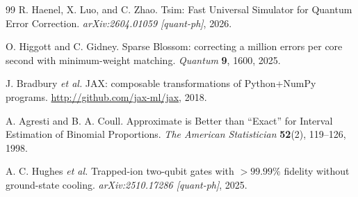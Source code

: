 \documentclass[a4paper]{article}
\begin{document}
\begin{thebibliography}{99}
R. Haenel, X. Luo, and C. Zhao.
\newblock Tsim: Fast Universal Simulator for Quantum Error Correction.
\newblock \textit{arXiv:2604.01059 [quant-ph]}, 2026.

O. Higgott and C. Gidney.
\newblock Sparse Blossom: correcting a million errors per core second with minimum-weight matching.
\newblock \textit{Quantum} \textbf{9}, 1600, 2025.

J. Bradbury \textit{et al.}
\newblock JAX: composable transformations of Python+NumPy programs.
\newblock \url{http://github.com/jax-ml/jax}, 2018.

A. Agresti and B. A. Coull.
\newblock Approximate is Better than ``Exact'' for Interval Estimation of Binomial Proportions.
\newblock \textit{The American Statistician} \textbf{52}(2), 119--126, 1998.

A. C. Hughes \textit{et al.}
\newblock Trapped-ion two-qubit gates with $>99.99\%$ fidelity without ground-state cooling.
\newblock \textit{arXiv:2510.17286 [quant-ph]}, 2025.

\end{thebibliography}
\end{document}
